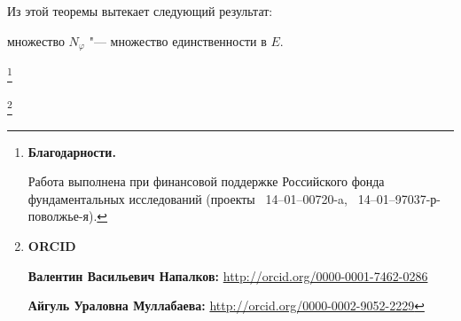 \smallskip

Из этой теоремы вытекает следующий результат:

множество $N_\varphi$ "--- множество единственности в $E$.











\thanks{\textbf{Благодарности.} 

Работа выполнена при финансовой поддержке Российского фонда фундаментальных исследований (проекты \No~14--01--00720-a, \No~14--01--97037-р-поволжье-я).

}



\thanks{{\bf ORCID}



{\bf Валентин Васильевич Напалков:} \url{http://orcid.org/0000-0001-7462-0286}



{\bf Айгуль Ураловна Муллабаева:} \url{http://orcid.org/0000-0002-9052-2229}





}



\RusRef







